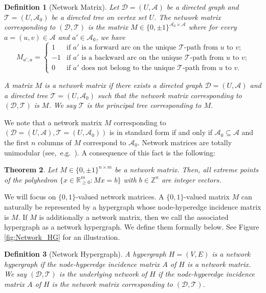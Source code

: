 \documentclass[11pt]{article}
\newtheorem{theorem}{Theorem}
\newtheorem{definition}[theorem]{Definition}
\begin{document}
\begin{definition}[Network Matrix]\label{def:network-matrix}
Let $\mathcal{D}=(U,\mathcal{A})$ be a directed graph and $\mathcal{T}=(U,\mathcal{A}_0)$ be a directed tree on vertex set $U$. The network matrix corresponding to $(\mathcal{D}, \mathcal{T})$ is the matrix $M\in\{0,\pm 1\}^{\mathcal{A}_0\times \mathcal{A}}$ where for every $a=(u,v)\in\mathcal{A}$ and $a'\in \mathcal{A}_0$, we have 
\begin{equation}\label{eq:Network-Matrix}
    M_{a',a}=\left\{
    \begin{array}{cc}
        1 & \textrm{if $a'$ is a forward arc on the unique $\mathcal{T}$-path from $u$ to $v$;}\\
        -1 & \textrm{if $a'$ is a backward arc on the unique $\mathcal{T}$-path from $u$ to $v$;} \\
        0 & \textrm{if $a'$ does not belong to the unique $\mathcal{T}$-path from $u$ to $v$.}
    \end{array}
    \right.
\end{equation}

A matrix $M$ is a \emph{network matrix} if there exists a directed graph $\mathcal{D}=(U,\mathcal{A})$ and a directed tree $\mathcal{T}=(U,\mathcal{A}_0)$ such that the network matrix corresponding to $(\mathcal{D}, \mathcal{T})$ is $M$. We say $\mathcal{T}$ is the \emph{principal tree} corresponding to $M$.
\end{definition}
We note that a network matrix $M$ corresponding to $(\mathcal{D}=(U,\mathcal{A}),\mathcal{T}=(U,\mathcal{A}_0))$ is in standard form if and only if $\mathcal{A}_0\subseteq \mathcal{A}$ and the first $n$ columns of $M$ correspond to $\mathcal{A}_0$. Network matrices are totally unimodular (see,~e.g.~\cite{schrijver1998theory}). A consequence of this fact is the following: 

\begin{theorem}\label{thm:Network-Matrix-TU}
Let $M\in\{0,\pm 1\}^{n\times m}$ be a network matrix. Then, all extreme points of the polyhedron $\{x\in\mathbb{R}^m_{\ge 0}:Mx=b\}$ with $b\in\mathbb{Z}^n$ are integer vectors.
\end{theorem}

We will focus on $\{0,1\}$-valued network matrices. A $\{0,1\}$-valued matrix $M$ can naturally be represented by a hypergraph whose node-hyperedge incidence matrix is $M$. If $M$ is additionally a network matrix, then we call the associated hypergraph as a network hypergraph. We define them formally below. See Figure \ref{fig:Network_HG} for an illustration.
\begin{definition}[Network Hypergraph]\label{def:Network_HG}
    A hypergraph $H=(V,E)$ is a \emph{network hypergraph} if the node-hyperedge incidence matrix $A$ of $H$ is a network matrix. We say $(\mathcal{D},\mathcal{T})$ is the \emph{underlying network} of $H$ if the node-hyperedge incidence matrix $A$ of $H$ is the network matrix corresponding to $(\mathcal{D},\mathcal{T})$.
\end{definition}
\end{document}
